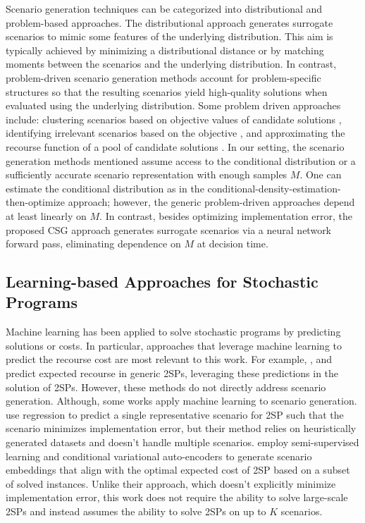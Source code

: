 Scenario generation techniques can be categorized into distributional and problem-based approaches. The distributional approach generates surrogate scenarios to mimic some features of the underlying distribution. This aim is typically achieved by minimizing a distributional distance \citep{dupavcova2003scenario} or by matching moments \citep{hoyland2003heuristic} between the scenarios and the underlying distribution. In contrast, problem-driven scenario generation methods account for problem-specific structures so that the resulting scenarios yield high-quality solutions when evaluated using the underlying distribution. Some problem driven approaches include: clustering scenarios based on objective values of candidate solutions \citep{bertsimas2023optimization}, identifying irrelevant scenarios based on the objective \citep{fairbrother2022tail}, and approximating the recourse function of a pool of candidate solutions \citep{narum2024problem}. In our setting, the scenario generation methods mentioned assume access to the conditional distribution or a sufficiently accurate scenario representation with enough samples $M$. One can estimate the conditional distribution as in the conditional-density-estimation-then-optimize approach; however, the generic problem-driven approaches depend at least linearly on $M$. In contrast, besides optimizing implementation error, the proposed CSG approach generates surrogate scenarios via a neural network forward pass, eliminating dependence on $M$ at decision time.




\subsection{Learning-based Approaches for Stochastic Programs}

Machine learning has been applied to solve stochastic programs by predicting solutions or costs. In particular, approaches that leverage machine learning to predict the recourse cost are most relevant to this work. For example, \citet{patel2022neur2sp}, \citet{lee2023value} and \citet{bae2023deep} predict expected recourse in generic 2SPs, leveraging these predictions in the solution of 2SPs. However, these methods do not directly address scenario generation. Although, some works apply machine learning to scenario generation. \citet{bengio2020learning} use regression to predict a single representative scenario for 2SP such that the scenario minimizes implementation error, but their method relies on heuristically generated datasets and doesn't handle multiple scenarios. \citet{wu2022learning} employ semi-supervised learning and conditional variational auto-encoders to generate scenario embeddings that align with the optimal expected cost of 2SP based on a subset of solved instances. Unlike their approach, which doesn't explicitly minimize implementation error, this work does not require the ability to solve large-scale 2SPs and instead assumes the ability to solve 2SPs on up to $K$ scenarios.